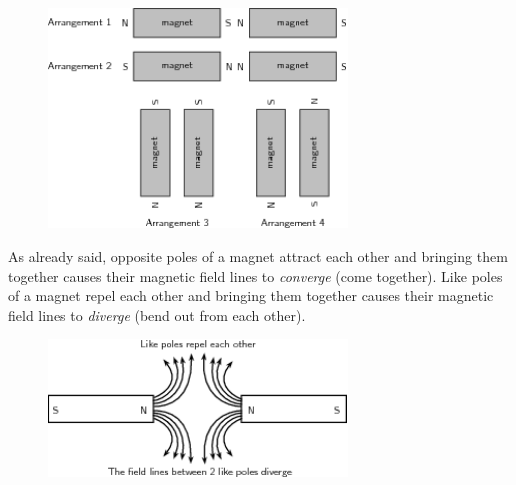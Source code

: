     \setcounter{subfigure}{0}


	\begin{figure}[H] %
    \begin{center}
    \label{m37830*id129120!!!underscore!!!media}\label{m37830*id129120!!!underscore!!!printimage}\includegraphics[width=300px]{col11305.imgs/m37830_PG10C7_011.png} %
        
      \vspace{2pt}
    \vspace{.1in}
    
    \end{center}

 \end{figure}   

    \addtocounter{footnote}{-0}
    
        \par 
        

        \label{m37830*id129134}As already said, opposite poles of a magnet attract each other and
bringing them together causes their magnetic field lines to
\textsl{converge} (come together). Like poles of a magnet repel each other and bringing
them together causes their magnetic field lines to \textsl{diverge} (bend out from each other).\par 
        \label{m37830*id129150}
          
    \setcounter{subfigure}{0}


	\begin{figure}[H] %
    \begin{center}
    \label{m37830*id129153!!!underscore!!!media}\label{m37830*id129153!!!underscore!!!printimage}\includegraphics[width=300px]{col11305.imgs/m37830_PG10C7_012.png} %
        
      \vspace{2pt}
    \vspace{.1in}
    
    \end{center}

 \end{figure}   

